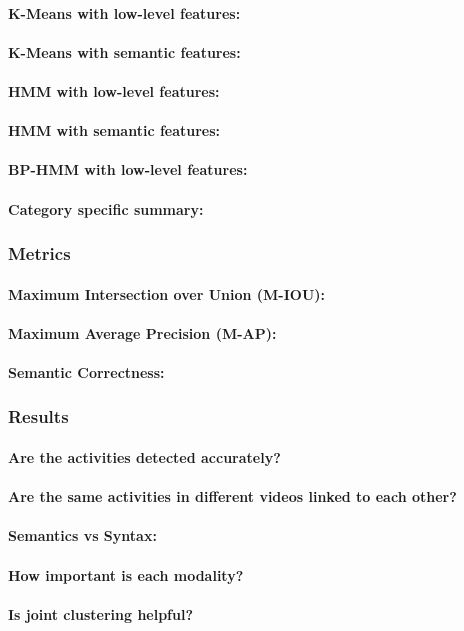 \paragraph{K-Means with low-level features:}
\paragraph{K-Means with semantic features:}
\paragraph{HMM with low-level features:}
\paragraph{HMM with semantic features:}
\paragraph{BP-HMM with low-level features:}
\paragraph{Category specific summary\cite{potapov2014category}:}


\subsubsection{Metrics}
\paragraph{Maximum Intersection over Union (M-IOU):}
\paragraph{Maximum Average Precision (M-AP):}
\paragraph{Semantic Correctness:}

\subsubsection{Results}
\paragraph{Are the activities detected accurately?}
\paragraph{Are the same activities in different videos linked to each other?}
\paragraph{Semantics vs Syntax:}
\paragraph{How important is each modality?}
\paragraph{Is joint clustering helpful?}
